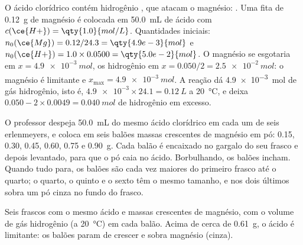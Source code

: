 \begin{example}\label{ex:g10:reaction-progress-table:magnesium}
O ácido clorídrico contém  hidrogênio , que atacam o magnésio:
. Uma fita de \qty{0.12}{g} de magnésio é
colocada em \qty{50.0}{mL} de ácido com $c(\ce{H+}) = \qty{1.0}{mol/L}$.
Quantidades iniciais: $n_0(\ce{Mg}) = 0.12/24.3 = \qty{4.9e-3}{mol}$ e
$n_0(\ce{H+}) = 1.0 \times 0.0500 = \qty{5.0e-2}{mol}$. O magnésio se
esgotaria em $x = \qty{4.9e-3}{mol}$, os  hidrogênio em
$x = 0.050/2 = \qty{2.5e-2}{mol}$: o magnésio é limitante e
$x_{\max} = \qty{4.9e-3}{mol}$. A reação dá \qty{4.9e-3}{mol} de gás
hidrogênio, isto é, $\num{4.9e-3} \times 24.1 = \qty{0.12}{L}$ a
\qty{20}{\celsius}, e deixa $0.050 - 2 \times 0.0049 =
\qty{0.040}{mol}$ de  hidrogênio em excesso.
\end{example}

\begin{inthelab}
O professor despeja \qty{50.0}{mL} do mesmo ácido clorídrico em cada um
de seis erlenmeyers, e coloca em seis balões massas crescentes de
magnésio em pó: 0.15, 0.30, 0.45, 0.60, 0.75 e \qty{0.90}{g}. Cada balão
é encaixado no gargalo do seu frasco e depois levantado, para que o pó
caia no ácido. Borbulhando, os balões incham. Quando tudo para, os balões
são cada vez maiores do primeiro frasco até o quarto; o quarto, o quinto
e o sexto têm o mesmo tamanho, e nos dois últimos sobra um pó cinza no
fundo do frasco.
\end{inthelab}

\begin{omfigure}

{\small Seis frascos com o mesmo ácido e massas crescentes de magnésio,
com o volume de gás hidrogênio (a \qty{20}{\celsius}) em cada balão.
Acima de cerca de \qty{0.61}{g}, o ácido é limitante: os balões param de
crescer e sobra magnésio (cinza).}
\end{omfigure}

